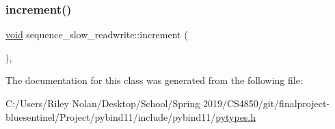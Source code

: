 \mbox{\label{classsequence__slow__readwrite_a96167779622e78b49732210fd0c18855}} 
\subsubsection{\texorpdfstring{increment()}{increment()}}
{\footnotesize\ttfamily \mbox{\hyperlink{_s_d_l__opengles2__gl2ext_8h_ae5d8fa23ad07c48bb609509eae494c95}{void}} sequence\+\_\+slow\+\_\+readwrite\+::increment (\begin{DoxyParamCaption}{ }\end{DoxyParamCaption})\hspace{0.3cm}{\ttfamily [inline]}, {\ttfamily [protected]}}



The documentation for this class was generated from the following file\+:\begin{DoxyCompactItemize}
\item 
C\+:/\+Users/\+Riley Nolan/\+Desktop/\+School/\+Spring 2019/\+C\+S4850/git/finalproject-\/bluesentinel/\+Project/pybind11/include/pybind11/\mbox{\hyperlink{pytypes_8h}{pytypes.\+h}}\end{DoxyCompactItemize}
